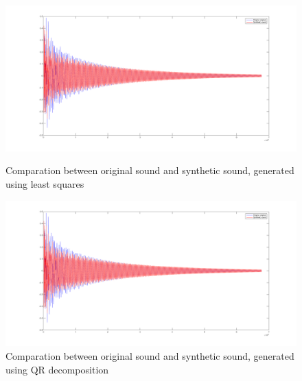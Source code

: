 \documentclass[a4paper]{article}
\begin{document}
\begin{figure}[H]
	\includegraphics[scale=0.3]{comparation_ab.png}
	\caption{Comparation between original sound and synthetic sound, generated using least squares}  
    \includegraphics[scale=0.3]{comparation_qr.png}
	\caption{Comparation between original sound and synthetic sound, generated using QR decomposition}
   
\end{figure}
\end{document}
